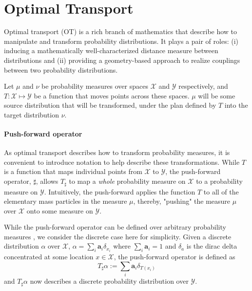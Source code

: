 \section{Optimal Transport}
Optimal transport (OT) is a rich branch of mathematics that describe how to manipulate and transform probability distributions.
It plays a pair of roles:
(i) inducing a mathematically well-characterized distance measure between distributions
and (ii) providing a geometry-based approach to realize couplings between two probability distributions.

Let $\mu$ and $\nu$ be probability measures over spaces $\mathcal{X}$ and $\mathcal{Y}$ respectively,
and $T : \mathcal{X} \mapsto \mathcal{Y}$ be a function that moves points across these spaces.
$\mu$ will be some source distribution that will be transformed, under the plan defined by $T$ into the target distribution $\nu$.

\paragraph{Push-forward operator}
As optimal transport describes how to transform probability measures,
it is convenient to introduce notation to help describe these transformations.
While $T$ is a function that maps individual points from $\mathcal{X}$ to $\mathcal{Y}$,
the push-forward operator, $\sharp$, allows $T_\sharp$ to
map a \emph{whole} probability measure on $\mathcal{X}$ to a probability measure on $\mathcal{Y}$.
Intuitively, the push-forward applies the function $T$ to all of the elementary mass particles in the measure $\mu$,
thereby, "pushing" the measure $\mu$ over $\mathcal{X}$ onto some measure on $\mathcal{Y}$.

While the push-forward operator can be defined over arbitrary probability measures \cite{villani2009},
we consider the discrete case here for simplicity.
Given a discrete distribution $\alpha$ over $\mathcal{X}$, $\alpha = \sum_i \mathbf{a}_i \delta_{x_i}$
where $\sum_i \mathbf{a}_i = 1$ and $\delta_a$ is the dirac delta concentrated at some location $x \in \mathcal{X}$,
the push-forward operator is defined as 
\begin{equation}
  \label{eq:def-pushfwd}
  T_\sharp\alpha := \sum_i \mathbf{a}_i \delta_{T(x_i)}
\end{equation}
and $T_\sharp\alpha$ now describes a discrete probability distribution over $\mathcal{Y}$.

